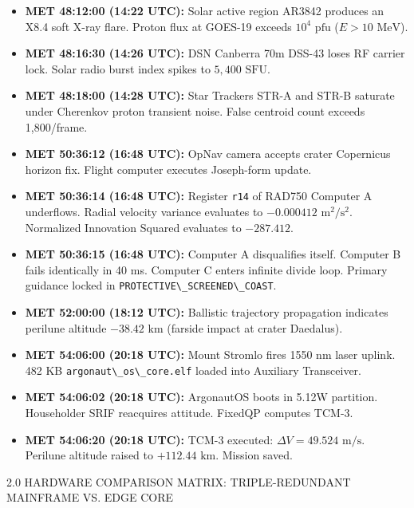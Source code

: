 \documentclass[12pt,twoside,openright]{book}
\newcommand{\sceneheader}[1]{%
  \par\vspace{1.8em}%
  {\noindent\centering\scshape\large #1\par}%
  \vspace{1.0em}%
  \noindent%
}
\newcommand{\dinkus}{%
  \par\vspace{1.2em}%
  {\noindent\centering{\large $\ast\quad\ast\quad\ast$}\par}%
  \vspace{1.2em}%
  \noindent%
}
\providecommand{\tightlist}{\setlength{\itemsep}{0pt}\setlength{\parskip}{0pt}
\setlength{\tabcolsep}{2pt}}
\begin{document}
\begin{itemize}
\tightlist
\item
  \textbf{MET 48:12:00 (14:22 UTC):} Solar active region AR3842 produces
  an X8.4 soft X-ray flare. Proton flux at GOES-19 exceeds
  \(10^4\text{ pfu}\) (\(E > 10\text{ MeV}\)).
\item
  \textbf{MET 48:16:30 (14:26 UTC):} DSN Canberra 70m DSS-43 loses RF
  carrier lock. Solar radio burst index spikes to \(5,400\text{ SFU}\).
\item
  \textbf{MET 48:18:00 (14:28 UTC):} Star Trackers STR-A and STR-B
  saturate under Cherenkov proton transient noise. False centroid count
  exceeds 1,800/frame.
\item
  \textbf{MET 50:36:12 (16:48 UTC):} OpNav camera accepts crater
  Copernicus horizon fix. Flight computer executes Joseph-form update.
\item
  \textbf{MET 50:36:14 (16:48 UTC):} Register
  \passthrough{\lstinline!r14!} of RAD750 Computer A underflows. Radial
  velocity variance evaluates to \(-0.000412\text{ m}^2/\text{s}^2\).
  Normalized Innovation Squared evaluates to \(-287.412\).
\item
  \textbf{MET 50:36:15 (16:48 UTC):} Computer A disqualifies itself.
  Computer B fails identically in 40 ms. Computer C enters infinite
  divide loop. Primary guidance locked in
  \passthrough{\lstinline!PROTECTIVE\_SCREENED\_COAST!}.
\item
  \textbf{MET 52:00:00 (18:12 UTC):} Ballistic trajectory propagation
  indicates perilune altitude \(-38.42\text{ km}\) (farside impact at
  crater Daedalus).
\item
  \textbf{MET 54:06:00 (20:18 UTC):} Mount Stromlo fires 1550 nm laser
  uplink. 482 KB \passthrough{\lstinline!argonaut\_os\_core.elf!} loaded
  into Auxiliary Transceiver.
\item
  \textbf{MET 54:06:02 (20:18 UTC):} ArgonautOS boots in 5.12W
  partition. Householder SRIF reacquires attitude. FixedQP computes
  TCM-3.
\item
  \textbf{MET 54:06:20 (20:18 UTC):} TCM-3 executed:
  \(\Delta V = 49.524\text{ m/s}\). Perilune altitude raised to
  \(+112.44\text{ km}\). Mission saved.
\end{itemize}

\dinkus

\sceneheader{2.0 HARDWARE COMPARISON MATRIX: TRIPLE-REDUNDANT
MAINFRAME VS. EDGE
CORE}
\end{document}
